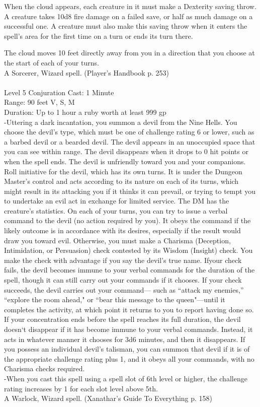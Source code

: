 \documentclass[10pt,twocolumn]{report}
\begin{document}
When the cloud appears, each creature in it must make a Dexterity saving throw. A creature takes 10d8 fire damage on a failed save, or half as much damage on a successful one. A creature must also make this saving throw when it enters the spell’s area for the first time on a turn or ends its turn there.

The cloud moves 10 feet directly away from you in a direction that you choose at the start of each of your turns.\\
A Sorcerer, Wizard spell. (Player's Handbook p. 253) \\


 \\
Level 5 \quad Conjuration \quad Cast: 1 Minute\\
Range: 90 feet \quad V, S, M\\
Duration: Up to 1 hour \quad a ruby worth at least 999 gp\\
-Uttering a dark incantation, you summon a devil from the Nine Hells. You choose the devil’s type, which must be one of challenge rating 6 or lower, such as a barbed devil or a bearded devil. The devil appears in an unoccupied space that you can see within range. The devil disappears when it drops to 0 hit points or when the spell ends.
The devil is unfriendly toward you and your companions. Roll initiative for the devil, which has its own turns. It is under the Dungeon Master’s control and acts according to its nature on each of its turns, which might result in its attacking you if it thinks it can prevail, or trying to tempt you to undertake an evil act in exchange for limited service. The DM has the creature’s statistics.
On each of your turns, you can try to issue a verbal command to the devil (no action required by you). It obeys the command if the likely outcome is in accordance with its desires, especially if the result would draw you toward evil. Otherwise, you must make a Charisma (Deception, Intimidation, or Persuasion) check contested by its Wisdom (Insight) check. You make the check with advantage if you say the devil’s true name. Ifyour check fails, the devil becomes immune to your verbal commands for the duration of the spell, though it can still carry out your commands if it chooses. If your check succeeds, the devil carries out your command— such as “attack my enemies,” “explore the room ahead," or “bear this message to the queen"—until it completes the activity, at which point it returns to you to report having done so.
If your concentration ends before the spell reaches its full duration, the devil doesn‘t disappear if it has become immune to your verbal commands. Instead, it acts in whatever manner it chooses for 3d6 minutes, and then it disappears.
If you possess an individual devil’s talisman, you can summon that devil if it is of the appropriate challenge
rating plus 1, and it obeys all your commands, with no Charisma checks required.\\
-When you cast this spell using a spell slot of 6th level or higher, the challenge rating increases by 1 for each slot level above 5th.\\
A Warlock, Wizard spell. (Xanathar's Guide To Everything p. 158) \\
\end{document}

